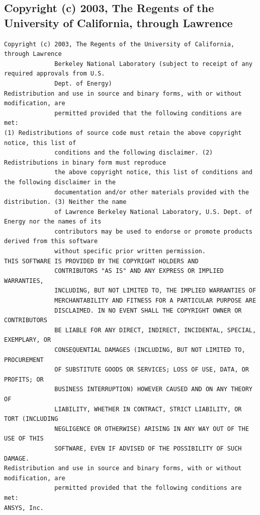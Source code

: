 \subsection{Copyright (c) 2003, The Regents of the University of California, through Lawrence}

\begin{lstlisting}[basicstyle=\ttfamily\scriptsize,breaklines=true]
Copyright (c) 2003, The Regents of the University of California, through Lawrence
              Berkeley National Laboratory (subject to receipt of any required approvals from U.S.
              Dept. of Energy)
Redistribution and use in source and binary forms, with or without modification, are
              permitted provided that the following conditions are met:
(1) Redistributions of source code must retain the above copyright notice, this list of
              conditions and the following disclaimer. (2) Redistributions in binary form must reproduce
              the above copyright notice, this list of conditions and the following disclaimer in the
              documentation and/or other materials provided with the distribution. (3) Neither the name
              of Lawrence Berkeley National Laboratory, U.S. Dept. of Energy nor the names of its
              contributors may be used to endorse or promote products derived from this software
              without specific prior written permission.
THIS SOFTWARE IS PROVIDED BY THE COPYRIGHT HOLDERS AND
              CONTRIBUTORS "AS IS" AND ANY EXPRESS OR IMPLIED WARRANTIES,
              INCLUDING, BUT NOT LIMITED TO, THE IMPLIED WARRANTIES OF
              MERCHANTABILITY AND FITNESS FOR A PARTICULAR PURPOSE ARE
              DISCLAIMED. IN NO EVENT SHALL THE COPYRIGHT OWNER OR CONTRIBUTORS
              BE LIABLE FOR ANY DIRECT, INDIRECT, INCIDENTAL, SPECIAL, EXEMPLARY, OR
              CONSEQUENTIAL DAMAGES (INCLUDING, BUT NOT LIMITED TO, PROCUREMENT
              OF SUBSTITUTE GOODS OR SERVICES; LOSS OF USE, DATA, OR PROFITS; OR
              BUSINESS INTERRUPTION) HOWEVER CAUSED AND ON ANY THEORY OF
              LIABILITY, WHETHER IN CONTRACT, STRICT LIABILITY, OR TORT (INCLUDING
              NEGLIGENCE OR OTHERWISE) ARISING IN ANY WAY OUT OF THE USE OF THIS
              SOFTWARE, EVEN IF ADVISED OF THE POSSIBILITY OF SUCH DAMAGE.
Redistribution and use in source and binary forms, with or without modification, are
              permitted provided that the following conditions are met:
ANSYS, Inc.


\end{lstlisting}
